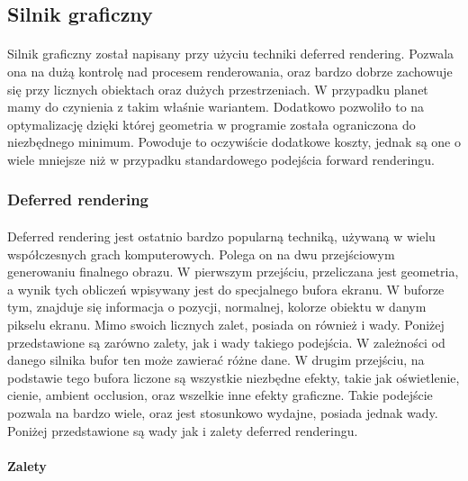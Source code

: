 \subsection{Silnik graficzny}\label{sub:silnik graficzny}
\paragraph{}

Silnik graficzny został napisany przy użyciu techniki deferred rendering. Pozwala ona na dużą kontrolę nad procesem renderowania, oraz bardzo dobrze zachowuje się przy licznych obiektach oraz dużych przestrzeniach. W przypadku planet mamy do czynienia z takim właśnie wariantem. Dodatkowo pozwoliło to na optymalizację dzięki której geometria w programie została ograniczona do niezbędnego minimum. Powoduje to oczywiście dodatkowe koszty, jednak są one o wiele mniejsze niż w przypadku standardowego podejścia forward renderingu.

\subsubsection{Deferred rendering}\label{ssub:deferred rendering}
\paragraph{}

Deferred rendering jest ostatnio bardzo popularną techniką, używaną w wielu współczesnych grach komputerowych. Polega on na dwu przejściowym generowaniu finalnego obrazu. W pierwszym przejściu, przeliczana jest geometria, a wynik tych obliczeń wpisywany jest do specjalnego bufora ekranu. W buforze tym, znajduje się informacja o pozycji, normalnej, kolorze obiektu w danym pikselu ekranu. Mimo swoich licznych zalet, posiada on również i wady. Poniżej przedstawione są zarówno zalety, jak i wady takiego podejścia. W zależności od danego silnika bufor ten może zawierać różne dane. W drugim przejściu, na podstawie tego bufora liczone są wszystkie niezbędne efekty, takie jak oświetlenie, cienie, ambient occlusion, oraz wszelkie inne efekty graficzne. Takie podejście pozwala na bardzo wiele, oraz jest stosunkowo wydajne, posiada jednak wady. Poniżej przedstawione są wady jak i zalety deferred renderingu.

\paragraph{Zalety}

